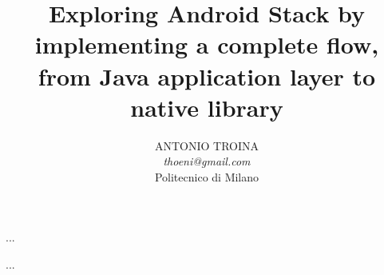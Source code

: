 \documentclass[acmplain,acmnow]{acmtrans2m}
\title{Exploring Android Stack by implementing a complete flow, from Java application layer to native library}
\author{ANTONIO TROINA\\\textit{thoeni@gmail.com}\\ Politecnico di Milano}
\begin{document}
            

            
\maketitle




\begin{thebibliography}{...}
...
\end{thebibliography}

\begin{received}
...
\end{received}
\end{document}
